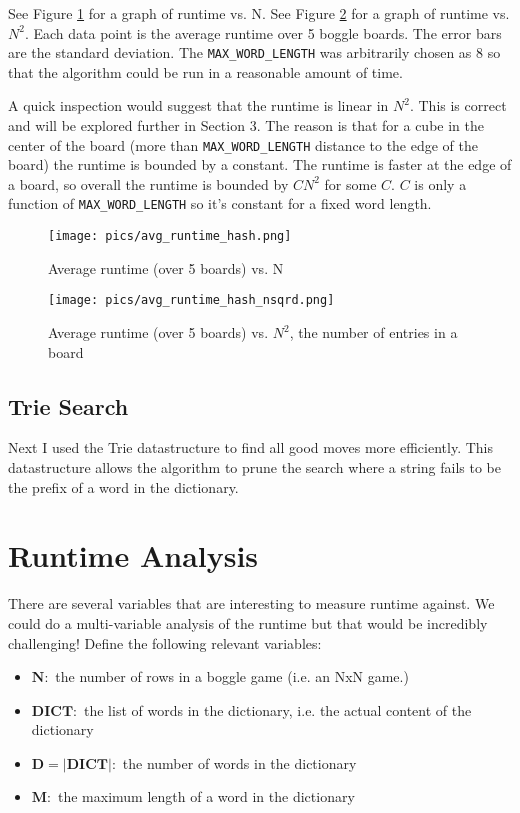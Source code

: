 \documentclass{article}
\begin{document}
See Figure \ref{image:avg_runtime_hash} for a graph of runtime vs. N. See Figure \ref{image:avg_runtime_hash_nsqrd} for a graph of runtime vs. $N^2$. Each data point is the average runtime over 5 boggle boards. The error bars are the standard deviation. The \verb=MAX_WORD_LENGTH= was arbitrarily chosen as 8 so that the algorithm could be run in a reasonable amount of time.

A quick inspection would suggest that the runtime is linear in $N^2$. This is correct and will be explored further in Section 3. The reason is that for a cube in the center of the board (more than \verb=MAX_WORD_LENGTH= distance to the edge of the board) the runtime is bounded by a constant. The runtime is faster at the edge of a board, so overall the runtime is bounded by $C N^2$ for some $C$. $C$ is only a function of \verb=MAX_WORD_LENGTH= so it's constant for a fixed word length.

\begin{figure}[htp]
\centering
\texttt{[image: pics/avg\_runtime\_hash.png]}
\caption{Average runtime (over 5 boards) vs. N}
\label{image:avg_runtime_hash}
\end{figure}

\begin{figure}[htp]
\centering
\texttt{[image: pics/avg\_runtime\_hash\_nsqrd.png]}
\caption{Average runtime (over 5 boards) vs. $N^2$, the number of entries in a board}
\label{image:avg_runtime_hash_nsqrd}
\end{figure}



\newpage
\subsection{Trie Search}
Next I used the Trie datastructure to find all good moves more efficiently. This datastructure allows the algorithm to prune the search where a string fails to be the prefix of a word in the dictionary.  

\section{Runtime Analysis}
There are several variables that are interesting to measure runtime against. We could do a multi-variable analysis of the runtime but that would be incredibly challenging! Define the following relevant variables: 

\begin{itemize}
\item $\mathbf{N} : $ the number of rows in a boggle game (i.e. an NxN game.)
\item $\mathbf{DICT} : $ the list of words in the dictionary, i.e. the actual content of the dictionary
\item $\mathbf{D = |DICT|} :$ the number of words in the dictionary

\item $\mathbf{M} : $ the maximum length of a word in the dictionary
\end{itemize}
\end{document}
